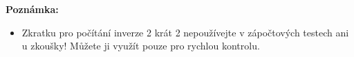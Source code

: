 \textbf{Poznámka:} \begin{itemize}
    \item Zkratku pro počítání inverze 2 krát 2 nepoužívejte v zápočtových testech ani u zkoušky! Můžete ji využít pouze pro rychlou kontrolu.
\end{itemize}